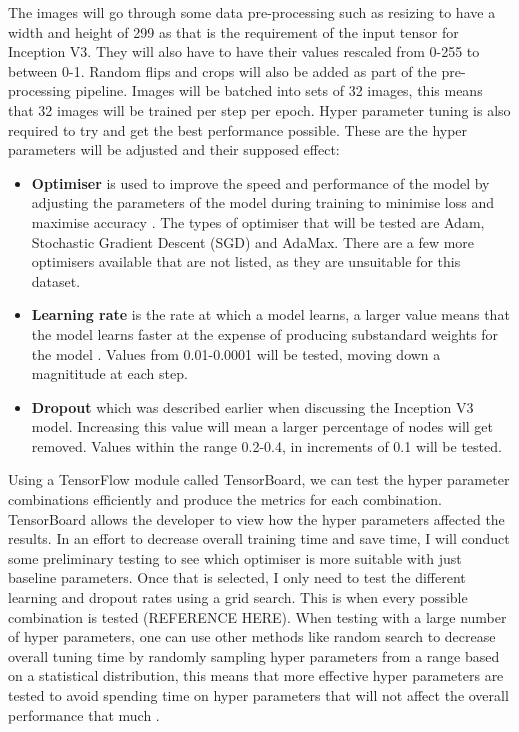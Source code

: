 \documentclass[12pt,a4paper]{report}
\begin{document}
The images will go through some data pre-processing such as resizing to have a width and height of 299 as that is the 
requirement of the input tensor for Inception V3. They will also have to have their values rescaled from 0-255 to 
between 0-1. Random flips and crops will also be added as part of the pre-processing pipeline. Images will be batched 
into sets of 32 images, this means that 32 images will be trained per step per epoch. Hyper parameter tuning is also 
required to try and get the best performance possible. These are the hyper parameters will be adjusted and
their supposed effect:

\begin{itemize}
    \item \textbf{Optimiser} is used to improve the speed and performance of the model by adjusting the parameters of the 
    model during training to minimise loss and maximise accuracy \citep{maithani}. The types of optimiser that will be
    tested are Adam, Stochastic Gradient Descent (SGD) and AdaMax. There are a few more optimisers 
    available that are not listed, as they are unsuitable for this dataset.
    \item \textbf{Learning rate} is the rate at which a model learns, a larger value means that the model learns faster 
    at the expense of producing substandard weights for the model \citep{andreaperlato}. Values from 0.01-0.0001 will
    be tested, moving down a magnititude at each step. 
    \item \textbf{Dropout} which was described earlier when discussing the Inception V3 model. Increasing this value 
    will mean a larger percentage of nodes will get removed. Values within the range 0.2-0.4, in increments of 0.1 
    will be tested.
\end{itemize}

Using a TensorFlow module called TensorBoard, we can test the hyper parameter combinations efficiently and produce the 
metrics for each combination. TensorBoard allows the developer to view how the hyper parameters affected the results. 
In an effort to decrease overall training time and save time, I will conduct some preliminary testing to see which 
optimiser is more suitable with just baseline parameters. Once that is selected, I only need to test the different 
learning and dropout rates using a grid search. This is when every possible combination is tested (REFERENCE HERE). 
When testing with a 
large number of hyper parameters, one can use other methods like random search to decrease overall tuning time by 
randomly sampling hyper parameters from a range based on a statistical distribution, this means that more effective 
hyper parameters are tested to avoid spending time on hyper parameters that will not affect the overall performance that
much \citep{sayak}. 
\end{document}
